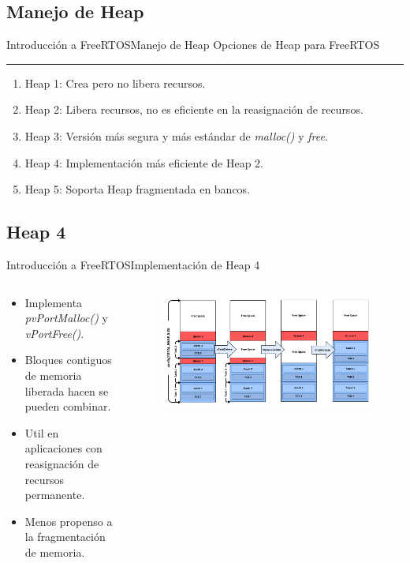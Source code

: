 \documentclass[aspectratio=169, xcolor=dvipsnames]{beamer}
\begin{document}
\subsection{Manejo de Heap}
\begin{frame}{Introducción a FreeRTOS}{Manejo de Heap}
Opciones de Heap para FreeRTOS
\noindent\rule{\textwidth}{0.75pt}
\begin{enumerate}
    \item Heap 1: Crea pero no libera recursos.
    \item Heap 2: Libera recursos, no es eficiente en la reasignación de recursos.
    \item Heap 3: Versión más segura y más estándar de \textit{malloc()} y \textit{free}.
    \item Heap 4: Implementación más eficiente de Heap 2.
    \item Heap 5: Soporta Heap fragmentada en bancos.
\end{enumerate}
\end{frame}

\subsection{Heap 4}
\begin{frame}{Introducción a FreeRTOS}{Implementación de Heap 4}
\begin{columns}
\begin{column}{0.4\textwidth}
\begin{itemize}
    \item Implementa \textit{pvPortMalloc()} y \textit{vPortFree()}.
    \item Bloques contiguos de memoria liberada hacen se pueden combinar.
    \item Util en aplicaciones con reasignación de recursos permanente.
    \item Menos propenso a la fragmentación de memoria.
\end{itemize}
\end{column}
\begin{column}{0.6\textwidth}
\begin{figure}
\centering
\includegraphics[width=1\linewidth]{resources/images/heap_4.png}
\end{figure}
\end{column}
\end{columns}
\end{frame}
\end{document}

